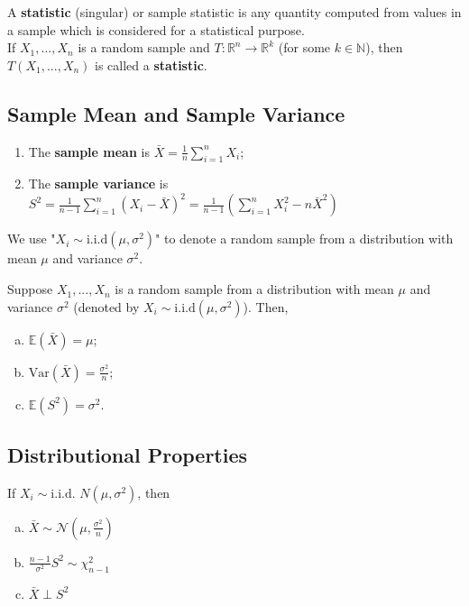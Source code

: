 \documentclass[11pt]{elegantbook}
\begin{document}
\begin{definition}[Statistic]
    \normalfont
    A \textbf{statistic} (singular) or sample statistic is any quantity computed from values in a sample which is considered for a statistical purpose.\\
    If $X_1,...,X_n$ is a random sample and $T: \mathbb{R}^n \rightarrow \mathbb{R}^k$ (for some $k\in \mathbb{N}$), then $T(X_1,...,X_n)$ is called a \textbf{statistic}.
\end{definition}

\subsection{Sample Mean and Sample Variance}
\begin{definition}
    \normalfont
    \begin{enumerate}
        \item The \textbf{sample mean} is $\bar{X}=\frac{1}{n}\sum_{i=1}^n X_i$;
        \item The \textbf{sample variance} is $S^2=\frac{1}{n-1}\sum_{i=1}^n (X_i-\bar{X})^2=\frac{1}{n-1}(\sum_{i=1}^n X_i^2 - n\bar{X}^2)$
    \end{enumerate}
\end{definition}

\begin{note}
    We use "$X_i\sim \text{i.i.d}(\mu,\sigma^2)$" to denote a random sample from a distribution with mean $\mu$ and variance $\sigma^2$.
\end{note}

\begin{theorem}
    Suppose $X_1,...,X_n$ is a random sample from a distribution with mean $\mu$ and variance $\sigma^2$ (denoted by $X_i\sim \text{i.i.d}(\mu,\sigma^2)$). Then,
    \begin{enumerate}[(a).]
        \item $\mathbb{E}(\bar{X})=\mu$;
        \item $\text{Var}(\bar{X})=\frac{\sigma^2}{n}$;
        \item $\mathbb{E}(S^2)=\sigma^2$.
    \end{enumerate}
\end{theorem}


\subsection{Distributional Properties}
\begin{theorem}
    If $X_i\sim \text{i.i.d. } N(\mu,\sigma^2)$, then
    \begin{enumerate}[(a).]
        \item $\bar{X}\sim \mathcal{N}(\mu,\frac{\sigma^2}{n})$
        \item $\frac{n-1}{\sigma^2}S^2\sim \chi^2_{n-1}$
        \item $\bar{X}\perp S^2$
    \end{enumerate}
\end{theorem}
\end{document}
